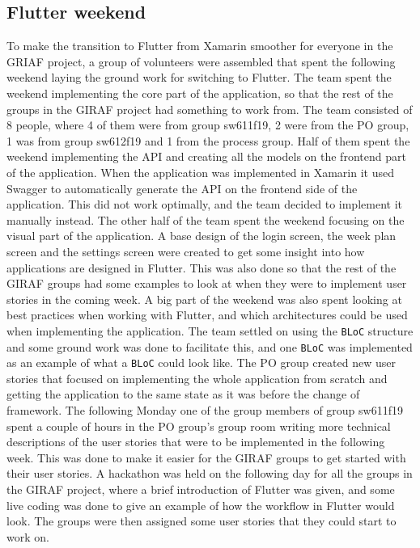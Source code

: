 \subsection{Flutter weekend}
To make the transition to Flutter from Xamarin smoother for everyone in the GRIAF project, a group of volunteers were assembled that spent the following weekend laying the ground work for switching to Flutter. 
The team spent the weekend implementing the core part of the application, so that the rest of the groups in the GIRAF project had something to work from. 
The team consisted of 8 people, where 4 of them were from group sw611f19, 2 were from the PO group, 1 was from group sw612f19 and 1 from the process group. 
Half of them spent the weekend implementing the API and creating all the models on the frontend part of the application. 
When the application was implemented in Xamarin it used Swagger to automatically generate the API on the frontend side of the application. 
This did not work optimally, and the team decided to implement it manually instead.
The other half of the team spent the weekend focusing on the visual part of the application.
A base design of the login screen, the week plan screen and the settings screen were created to get some insight into how applications are designed in Flutter.
This was also done so that the rest of the GIRAF groups had some examples to look at when they were to implement user stories in the coming week.
A big part of the weekend was also spent looking at best practices when working with Flutter, and which architectures could be used when implementing the application.
The team settled on using the \texttt{BLoC} structure and some ground work was done to facilitate this, and one \texttt{BLoC} was implemented as an example of what a \texttt{BLoC} could look like.
The PO group created new user stories that focused on implementing the whole application from scratch and getting the application to the same state as it was before the change of framework.
The following Monday one of the group members of group sw611f19 spent a couple of hours in the PO group's group room writing more technical descriptions of the user stories that were to be implemented in the following week.
This was done to make it easier for the GIRAF groups to get started with their user stories.
A hackathon was held on the following day for all the groups in the GIRAF project, where a brief introduction of Flutter was given, and some live coding was done to give an example of how the workflow in Flutter would look.
The groups were then assigned some user stories that they could start to work on.
